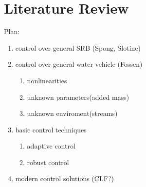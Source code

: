 \chapter{Literature Review}
\label{chap:lr}

Plan:
\begin{enumerate}
    \item control over general SRB (Spong, Slotine)
    \item control over general water vehicle (Fossen)
        \begin{enumerate}
            \item nonlinearities
            \item unknown parameters(added mass)
            \item unknown enviroment(streams)
        \end{enumerate}
    \item basic control techniques
        \begin{enumerate}
            \item adaptive control
            \item robust control
        \end{enumerate}
    \item modern control solutions (CLF?)
\end{enumerate}
